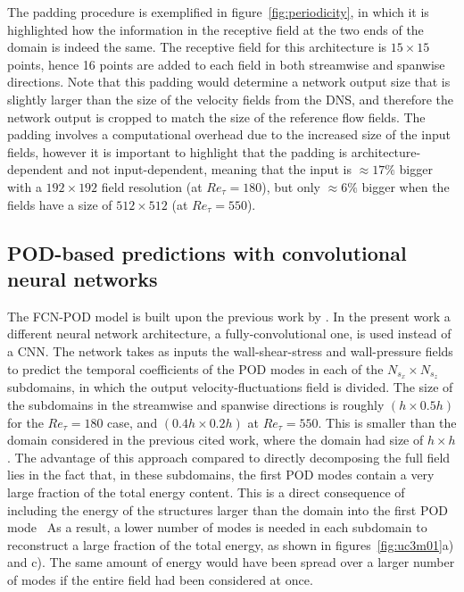 The padding procedure is exemplified in figure~\ref{fig:periodicity}, in which it is highlighted how the information in the receptive field at the two ends of the domain is indeed the same.
The receptive field for this architecture is $15 \times 15$ points, hence 16 points are added to each field in both streamwise and spanwise directions.
Note that this padding would determine a network output size that is slightly larger than the size of the velocity fields from the DNS, and therefore the network output is cropped to match the size of the reference flow fields.
The padding involves a computational overhead due to the increased size of the input fields, however it is important to highlight that the padding is architecture-dependent and not input-dependent, meaning that the input is $\approx 17\%$ bigger with a $192 \times 192$ field resolution (at $Re_{\tau} = 180$), but only $\approx 6\%$ bigger when the fields have a size of $512 \times 512$ (at $Re_{\tau} = 550$).

\subsection{POD-based predictions with convolutional neural networks}\label{ss:FCN-POD}

The FCN-POD model is built upon the previous work by \citet{guemes2019sensing}.
In the present work a different neural network architecture, a fully-convolutional one, is used instead of a CNN.
The network takes as inputs the wall-shear-stress and wall-pressure fields to predict the temporal coefficients of the POD modes in each of the $N_{s_x}\times N_{s_z}$ subdomains, in which the output velocity-fluctuations field is divided.
The size of the subdomains in the streamwise and spanwise directions is roughly $(h\times0.5h)$ for the $Re_{\tau}=180$ case, and $(0.4h\times0.2h)$ at $Re_{\tau}=550$.
This is smaller than the domain considered in the previous cited work, where the domain had size of $h\times h$. The advantage of this approach compared to directly decomposing the full field lies in the fact that, in these subdomains, the first POD modes contain a very large fraction of the total energy content.
This is a direct consequence of including the energy of the structures larger than the domain into the first POD mode~\citep{liu2001large,wu2014study}
As a result, a lower number of modes is needed in each subdomain to reconstruct a large fraction of the total energy, as shown in figures~\ref{fig:uc3m01}a) and c).
The same amount of energy would have been spread over a larger number of modes if the entire field had been considered at once.

